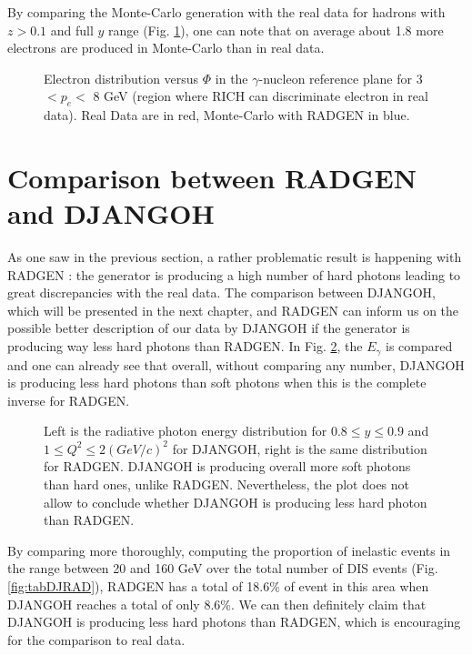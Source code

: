 By comparing the Monte-Carlo generation with the real data for hadrons with $z>0.1$ and full $y$ range (Fig. \ref{fig:ph_pl}), one can note that on
average about 1.8 more electrons are produced in Monte-Carlo than in real data.

\begin{figure}[htb!]
\centerline{}
\caption{Electron distribution versus $\Phi$ in the $\gamma$-nucleon reference plane for 3 $< p_e <$ 8 GeV (region where RICH can discriminate electron in real data). Real Data are in red, Monte-Carlo with RADGEN in blue.}\label{fig:ph_pl}
\end{figure}


\section{Comparison between RADGEN and DJANGOH}

As one saw in the previous section, a rather problematic result is happening with RADGEN : the generator is
producing a high number of hard photons leading to great discrepancies with the real data. The comparison between
DJANGOH, which will be presented in the next chapter, and RADGEN can inform us on the possible better description
of our data by DJANGOH if the generator is producing way less hard photons than RADGEN. In Fig. \ref{fig:DJRAD},
the $E_{\gamma}$ is compared and one can already see that overall, without comparing any number, DJANGOH is producing
less hard photons than soft photons when this is the complete inverse for RADGEN.

\begin{figure}[htb]
\centerline{}
\caption{Left is the radiative photon energy distribution for $0.8 \leq y \leq 0.9$ and $1 \leq Q^2 \leq 2 (GeV/c)^2$ for DJANGOH, right is the same distribution for RADGEN.
DJANGOH is producing overall more soft photons than hard ones, unlike RADGEN. Nevertheless, the plot does not allow
to conclude whether DJANGOH is producing less hard photon than RADGEN.}\label{fig:DJRAD}
\end{figure}

By comparing more thoroughly, computing the proportion of inelastic events in the range between 20 and 160 GeV
over the total number of DIS events (Fig. \ref{fig:tabDJRAD}), RADGEN has a total of 18.6\% of event in this
area when DJANGOH reaches a total of only 8.6\%. We can then definitely claim that DJANGOH is producing less
hard photons than RADGEN, which is encouraging for the comparison to real data.

